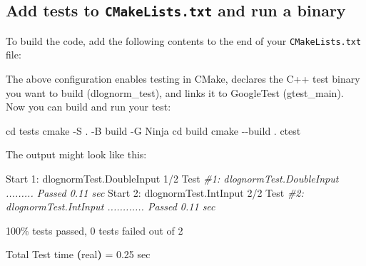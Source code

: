 \documentclass[
]{book}
\newenvironment{Shaded}{\begin{snugshade}}{\end{snugshade}}
\newcommand{\AttributeTok}[1]{\textcolor[rgb]{0.77,0.63,0.00}{#1}}
\newcommand{\BuiltInTok}[1]{#1}
\newcommand{\CommentTok}[1]{\textcolor[rgb]{0.56,0.35,0.01}{\textit{#1}}}
\newcommand{\DecValTok}[1]{\textcolor[rgb]{0.00,0.00,0.81}{#1}}
\newcommand{\ErrorTok}[1]{\textcolor[rgb]{0.64,0.00,0.00}{\textbf{#1}}}
\newcommand{\ExtensionTok}[1]{#1}
\newcommand{\FunctionTok}[1]{\textcolor[rgb]{0.00,0.00,0.00}{#1}}
\newcommand{\KeywordTok}[1]{\textcolor[rgb]{0.13,0.29,0.53}{\textbf{#1}}}
\newcommand{\NormalTok}[1]{#1}
\newcommand{\OtherTok}[1]{\textcolor[rgb]{0.56,0.35,0.01}{#1}}
\begin{document}
\hypertarget{add-tests-to-cmakelists.txt-and-run-a-binary}{%
\subsection{\texorpdfstring{Add tests to \texttt{CMakeLists.txt} and run a binary}{Add tests to CMakeLists.txt and run a binary}}\label{add-tests-to-cmakelists.txt-and-run-a-binary}}

To build the code, add the following contents to the end of your \texttt{CMakeLists.txt} file:

\begin{Shaded}
\end{Shaded}

The above configuration enables testing in CMake, declares the C++ test binary you want to build (dlognorm\_test), and links it to GoogleTest (gtest\_main). Now you can build and run your test:

\begin{Shaded}
\begin{Highlighting}[]
\BuiltInTok{cd}\NormalTok{ tests}
\FunctionTok{cmake} \AttributeTok{{-}S}\NormalTok{ . }\AttributeTok{{-}B}\NormalTok{ build }\AttributeTok{{-}G}\NormalTok{ Ninja}
\BuiltInTok{cd}\NormalTok{ build }
\FunctionTok{cmake} \AttributeTok{{-}{-}build}\NormalTok{ .}
\ExtensionTok{ctest}
\end{Highlighting}
\end{Shaded}

The output might look like this:

\begin{Shaded}
\begin{Highlighting}[]
\ExtensionTok{Start}\NormalTok{ 1: dlognormTest.DoubleInput}
\ExtensionTok{1/2}\NormalTok{ Test }\CommentTok{\#1: dlognormTest.DoubleInput .........   Passed    0.11 sec}
\ExtensionTok{Start}\NormalTok{ 2: dlognormTest.IntInput}
\ExtensionTok{2/2}\NormalTok{ Test }\CommentTok{\#2: dlognormTest.IntInput ............   Passed    0.11 sec}

\ExtensionTok{100\%}\NormalTok{ tests passed, 0 tests failed out of 2}

\ExtensionTok{Total}\NormalTok{ Test time }\ErrorTok{(}\ExtensionTok{real}\KeywordTok{)} \ExtensionTok{=}\NormalTok{   0.25 sec}
\end{Highlighting}
\end{Shaded}
\end{document}
